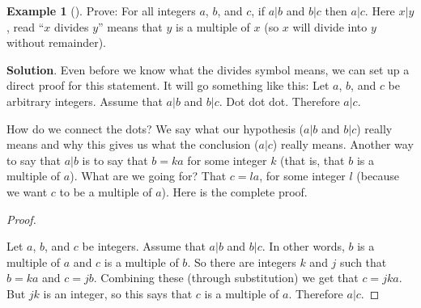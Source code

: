\documentclass[10pt,]{book}
\theoremstyle{plain}
\theoremstyle{definition}
\theoremstyle{definition}
\newtheorem{example}[theorem]{Example}
\theoremstyle{definition}
\theoremstyle{definition}
\numberwithin{equation}{chapter}
\begin{document}
\begin{example}[]\label{example-65}
\hypertarget{p-2049}{}%
Prove: For all integers \(a\), \(b\), and \(c\), if \(a|b\) and \(b|c\) then \(a|c\). Here \(x|y\), read ``\(x\) divides \(y\)'' means that \(y\) is a multiple of \(x\) (so \(x\) will divide into \(y\) without remainder).%
\par\smallskip%
\noindent\textbf{Solution}.\hypertarget{solution-182}{}\quad%
\hypertarget{p-2050}{}%
Even before we know what the divides symbol means, we can set up a direct proof for this statement. It will go something like this: Let \(a\), \(b\), and \(c\) be arbitrary integers. Assume that \(a|b\) and \(b|c\). Dot dot dot. Therefore \(a|c\).%
\par
\hypertarget{p-2051}{}%
How do we connect the dots? We say what our hypothesis (\(a|b\) and \(b|c\)) really means and why this gives us what the conclusion (\(a|c\)) really means. Another way to say that \(a|b\) is to say that \(b = ka\) for some integer \(k\) (that is, that \(b\) is a multiple of \(a\)). What are we going for? That \(c = la\), for some integer \(l\) (because we want \(c\) to be a multiple of \(a\)). Here is the complete proof.%
\begin{proof}\hypertarget{proof-22}{}
\hypertarget{p-2052}{}%
Let \(a\), \(b\), and \(c\) be integers. Assume that \(a|b\) and \(b|c\). In other words, \(b\) is a multiple of \(a\) and \(c\) is a multiple of \(b\). So there are integers \(k\) and \(j\) such that \(b = ka\) and \(c = jb\). Combining these (through substitution) we get that \(c = jka\). But \(jk\) is an integer, so this says that \(c\) is a multiple of \(a\). Therefore \(a|c\).%
\end{proof}
\end{example}
\typeout{************************************************}
\typeout{************************************************}
\end{document}
